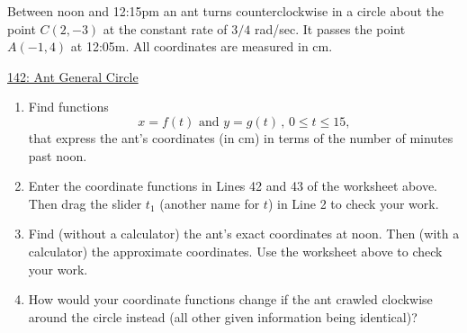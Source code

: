 \documentclass{ximera}
\begin{document}
\begin{question} \label{QLdferr444}
Between noon and 12:15pm an ant turns counterclockwise in a circle about the point $C(2,-3)$ at the constant rate of $3/4$ rad/sec. It passes the point $A(-1,4)$ at 12:05m. All coordinates are measured in cm.

\begin{onlineOnly}
    \begin{center}
\end{center}
\end{onlineOnly}

\href{https://www.desmos.com/calculator/genxpc7blg}{142: Ant General Circle}


\begin{enumerate}
\item Find functions
\[
   x = f(t) \text{ and } y=g(t) \, , \, 0\leq t \leq 15,
\]
that express the ant's coordinates (in cm) in terms of the number of minutes past noon.

\item Enter the coordinate functions in Lines 42 and 43 of the worksheet above. Then drag the slider $t_1$ (another name for $t$) in Line 2 to check your work.

\item Find (without a calculator) the ant's exact coordinates at noon. Then (with a calculator) the approximate coordinates. Use the worksheet above to check your work.

\item How would your coordinate functions change if the ant crawled clockwise around the circle instead (all other given information being identical)?

\end{enumerate}
\end{question}
\end{document}
